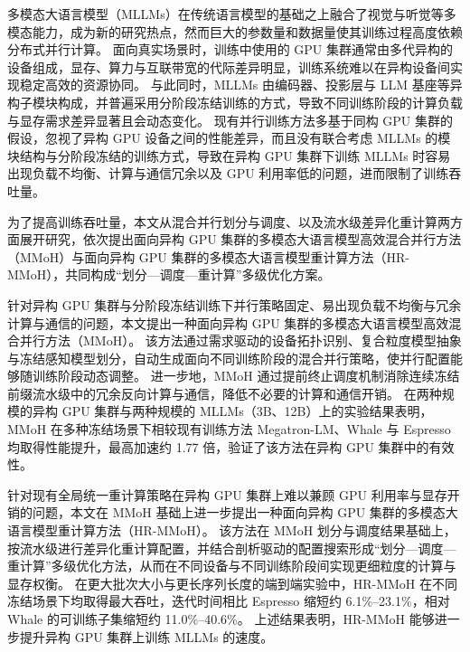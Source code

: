 \begin{cabstract}
多模态大语言模型（MLLMs）在传统语言模型的基础之上融合了视觉与听觉等多模态能力，成为新的研究热点，然而巨大的参数量和数据量使其训练过程高度依赖分布式并行计算。
面向真实场景时，训练中使用的 GPU 集群通常由多代异构的设备组成，显存、算力与互联带宽的代际差异明显，训练系统难以在异构设备间实现稳定高效的资源协同。
与此同时，MLLMs 由编码器、投影层与 LLM 基座等异构子模块构成，并普遍采用分阶段冻结训练的方式，导致不同训练阶段的计算负载与显存需求差异显著且会动态变化。
现有并行训练方法多基于同构 GPU 集群的假设，忽视了异构 GPU 设备之间的性能差异，而且没有联合考虑 MLLMs 的模块结构与分阶段冻结的训练方式，导致在异构 GPU 集群下训练 MLLMs 时容易出现负载不均衡、计算与通信冗余以及 GPU 利用率低的问题，进而限制了训练吞吐量。

为了提高训练吞吐量，本文从混合并行划分与调度、以及流水级差异化重计算两方面展开研究，依次提出面向异构 GPU 集群的多模态大语言模型高效混合并行方法（MMoH）与面向异构 GPU 集群的多模态大语言模型重计算方法（HR-MMoH），共同构成“划分—调度—重计算”多级优化方案。

针对异构 GPU 集群与分阶段冻结训练下并行策略固定、易出现负载不均衡与冗余计算与通信的问题，本文提出一种面向异构 GPU 集群的多模态大语言模型高效混合并行方法（MMoH）。
该方法通过需求驱动的设备拓扑识别、复合粒度模型抽象与冻结感知模型划分，自动生成面向不同训练阶段的混合并行策略，使并行配置能够随训练阶段动态调整。
进一步地，MMoH 通过提前终止调度机制消除连续冻结前缀流水级中的冗余反向计算与通信，降低不必要的计算和通信开销。
在两种规模的异构 GPU 集群与两种规模的 MLLMs（3B、12B）上的实验结果表明，MMoH 在多种冻结场景下相较现有训练方法 Megatron-LM、Whale 与 Espresso 均取得性能提升，最高加速约 1.77 倍，验证了该方法在异构 GPU 集群中的有效性。

针对现有全局统一重计算策略在异构 GPU 集群上难以兼顾 GPU 利用率与显存开销的问题，本文在 MMoH 基础上进一步提出一种面向异构 GPU 集群的多模态大语言模型重计算方法（HR-MMoH）。
该方法在 MMoH 划分与调度结果基础上，按流水级进行差异化重计算配置，并结合剖析驱动的配置搜索形成“划分—调度—重计算”多级优化方法，从而在不同设备与不同训练阶段间实现更细粒度的计算与显存权衡。
在更大批次大小与更长序列长度的端到端实验中，HR-MMoH 在不同冻结场景下均取得最大吞吐，迭代时间相比 Espresso 缩短约 6.1\%--23.1\%，相对 Whale 的可训练子集缩短约 11.0\%--40.6\%。
上述结果表明，HR-MMoH 能够进一步提升异构 GPU 集群上训练 MLLMs 的速度。
\end{cabstract}

\clearpage
\ifodd\value{page}\else
  \null
  \clearpage
\fi

